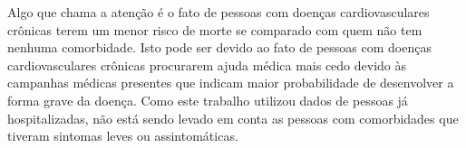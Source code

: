 Algo que chama a atenção é o fato de pessoas com doenças cardiovasculares crônicas terem um menor risco de morte se comparado com quem não tem nenhuma comorbidade.
Isto pode ser devido ao fato de pessoas com doenças cardiovasculares crônicas procurarem ajuda médica mais cedo devido às campanhas médicas presentes que indicam maior probabilidade de desenvolver a forma grave da doença.
Como este trabalho utilizou dados de pessoas já hospitalizadas, não está sendo levado em conta as pessoas com comorbidades que tiveram sintomas leves ou assintomáticas.
